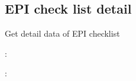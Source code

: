 \documentclass[letterpaper,10pt,english,openany,oneside]{sphinxmanual}
\begin{document}
\subsection{EPI check list detail}
\label{\detokenize{api-checklist/v1:epi-check-list-detail}}

\begin{fulllineitems}
\label{\detokenize{api-checklist/v1:post--api-checklist-v1-epi-detail}}
\sphinxAtStartPar
Get detail data of EPI checklist

\sphinxAtStartPar
{}:

\begin{sphinxVerbatim}[commandchars=\\\{\}]
\end{sphinxVerbatim}

\sphinxAtStartPar
{}:


\end{fulllineitems}
\end{document}
